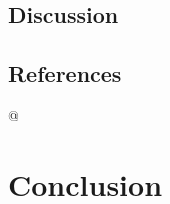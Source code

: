 \documentclass[
12pt, %
english, %
doublespacing, %
nolistspacing, %
liststotoc, %
headsepline, %
chapterinoneline, %
openany, %
]{DoctoralThesis}\usepackage[]{graphicx}\usepackage[]{color}
\begin{document}
\section{Discussion}




\section{References}










@


\chapter{Conclusion} %

\label{Chapter5} %

\end{document}
